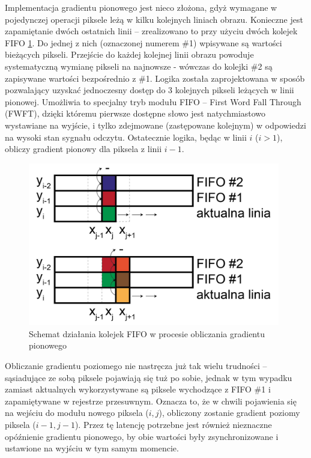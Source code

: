 Implementacja gradientu pionowego jest nieco złożona, gdyż wymagane w pojedynczej operacji piksele leżą w kilku kolejnych liniach obrazu. 
Konieczne jest zapamiętanie dwóch ostatnich linii -- zrealizowano to przy użyciu dwóch kolejek FIFO \ref{fig:fifo_gradient}.
Do jednej z nich (oznaczonej numerem \#1) wpisywane są wartości bieżących pikseli.
Przejście do każdej kolejnej linii obrazu powoduje systematyczną wymianę pikseli na najnowsze - wówczas do kolejki \#2 są zapisywane wartości bezpośrednio z \#1. %
Logika została zaprojektowana w sposób pozwalający uzyskać jednoczesny dostęp do 3 kolejnych pikseli leżących w linii pionowej. 
Umożliwia to specjalny tryb modułu FIFO -- First Word Fall Through (FWFT), dzięki któremu pierwsze dostępne słowo jest natychmiastowo wystawiane na wyjście, i tylko zdejmowane (zastępowane kolejnym) w odpowiedzi na wysoki stan sygnału odczytu. %
Ostatecznie logika, będąc w linii $i$ ($i>1$), obliczy gradient pionowy dla piksela z linii $i-1$. %
\begin{figure}[h]
	\centering
	\includegraphics[width=11cm]{4_fifo_gradient.jpg}
	\caption{Schemat działania kolejek FIFO w procesie obliczania gradientu pionowego}
	\label{fig:fifo_gradient}
\end{figure}

Obliczanie gradientu poziomego nie nastręcza już tak wielu trudności -- sąsiadujące ze sobą piksele pojawiają się tuż po sobie, jednak w tym wypadku zamiast aktualnych wykorzystywane są piksele wychodzące z FIFO \#1 i zapamiętywane w rejestrze przesuwnym. 
Oznacza to, że w chwili pojawienia się na wejściu do modułu nowego piksela ($i,j$), obliczony zostanie gradient poziomy piksela ($i-1,j-1$). 
Przez tę latencję potrzebne jest również nieznaczne opóźnienie gradientu pionowego, by obie wartości były zsynchronizowane i ustawione na wyjściu w tym samym momencie.

